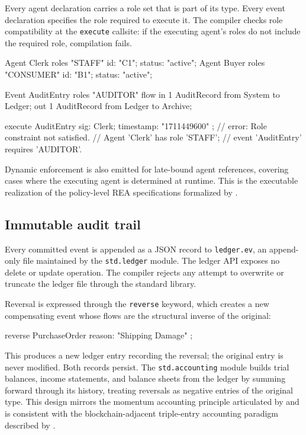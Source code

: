 \documentclass[11pt,a4paper]{article}
\theoremstyle{remark}
\begin{document}
Every agent declaration carries a role set that is part of its type.
Every event declaration specifies the role required to execute it. The
compiler checks role compatibility at the \texttt{execute} callsite: if
the executing agent's roles do not include the required role,
compilation fails.

\begin{equiscode}
Agent Clerk  roles { "STAFF"   } { id: "C1"; status: "active"; }
Agent Buyer  roles { "CONSUMER" } { id: "B1"; status: "active"; }

Event AuditEntry roles { "AUDITOR" } {
    flow {
        in  1 AuditRecord from System to Ledger;
        out 1 AuditRecord from Ledger to Archive;
    }
}

execute AuditEntry { sig: Clerk; timestamp: "1711449600" };
// error: Role constraint not satisfied.
// Agent 'Clerk' has role 'STAFF';
// event 'AuditEntry' requires 'AUDITOR'.
\end{equiscode}

Dynamic enforcement is also emitted for late-bound agent references,
covering cases where the executing agent is determined at runtime. This
is the executable realization of the policy-level REA specifications
formalized by \citet{geerts_policy-level_2006}.

\subsection{Immutable audit trail}\label{sec:design:ledger}

Every committed event is appended as a JSON record to
\texttt{ledger.ev}, an append-only file maintained by the
\texttt{std.ledger} module. The ledger API exposes no delete or update
operation. The compiler rejects any attempt to overwrite or truncate the
ledger file through the standard library.

Reversal is expressed through the \texttt{reverse} keyword, which
creates a new compensating event whose flows are the structural inverse
of the original:

\begin{equiscode}
reverse PurchaseOrder { reason: "Shipping Damage" };
\end{equiscode}

This produces a new ledger entry recording the reversal; the original
entry is never modified. Both records persist. The
\texttt{std.accounting} module builds trial balances, income statements,
and balance sheets from the ledger by summing forward through its
history, treating reversals as negative entries of the original type.
This design mirrors the momentum accounting principle articulated by
\citet{ijiri_theory_1975} and is consistent with the blockchain-adjacent
triple-entry accounting paradigm described by \citet{ibanez_rea_2020}.
\end{document}
